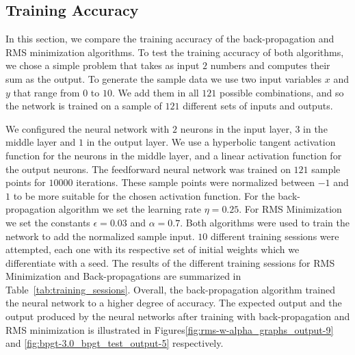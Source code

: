 \documentclass[11pt]{article}
\begin{document}
\subsection{Training Accuracy} %
\label{sub:training_accuracy}

In this section, we compare the training accuracy of the back-propagation and RMS minimization algorithms. To test the training accuracy
of both algorithms, we chose a simple problem that takes as input $2$ numbers and computes their sum as the output. To generate the
sample data we use two input variables $x$ and $y$ that range from $0$ to $10$. We add them in all $121$ possible combinations, and so
the network is trained on a sample of $121$ different sets of inputs and outputs.

We configured the neural network with $2$ neurons in the input layer, $3$ in the middle layer and $1$ in the output layer. We use a
hyperbolic tangent activation function for the neurons in the middle layer, and a linear activation function for the output neurons. The
feedforward neural network was trained on $121$ sample points for $10000$ iterations. These sample points were normalized between $-1$
and $1$ to be more suitable for the chosen activation function. For the back-propagation algorithm we set the learning rate $\eta=0.25$.
For RMS Minimization we set the constants $\epsilon=0.03$ and $\alpha=0.7$. Both algorithms were used to train the network to add the
normalized sample input. $10$ different training sessions were attempted, each one with its respective set of initial weights which we
differentiate with a seed. The results of the different training sessions for RMS Minimization and Back-propagations are summarized in
Table~\ref{tab:training_sessions}. Overall, the back-propagation algorithm trained the neural network to a higher degree of accuracy.
The expected output and the output produced by the neural networks after training with back-propagation and RMS minimization is
illustrated in Figures\ref{fig:rms-w-alpha_graphs_output-9} and \ref{fig:bpgt-3.0_bpgt_test_output-5} respectively.
\end{document}
